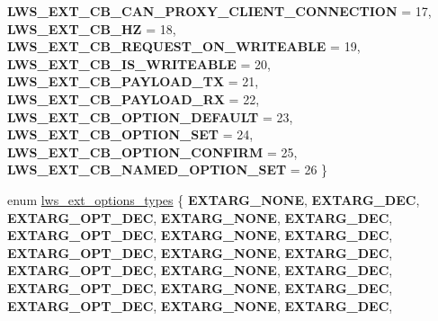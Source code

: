 \begin{DoxyCompactItemize}
\newline
{\bfseries L\+W\+S\+\_\+\+E\+X\+T\+\_\+\+C\+B\+\_\+\+C\+A\+N\+\_\+\+P\+R\+O\+X\+Y\+\_\+\+C\+L\+I\+E\+N\+T\+\_\+\+C\+O\+N\+N\+E\+C\+T\+I\+ON} = 17, 
{\bfseries L\+W\+S\+\_\+\+E\+X\+T\+\_\+\+C\+B\+\_\+HZ} = 18, 
{\bfseries L\+W\+S\+\_\+\+E\+X\+T\+\_\+\+C\+B\+\_\+\+R\+E\+Q\+U\+E\+S\+T\+\_\+\+O\+N\+\_\+\+W\+R\+I\+T\+E\+A\+B\+LE} = 19, 
{\bfseries L\+W\+S\+\_\+\+E\+X\+T\+\_\+\+C\+B\+\_\+\+I\+S\+\_\+\+W\+R\+I\+T\+E\+A\+B\+LE} = 20, 
\newline
{\bfseries L\+W\+S\+\_\+\+E\+X\+T\+\_\+\+C\+B\+\_\+\+P\+A\+Y\+L\+O\+A\+D\+\_\+\+TX} = 21, 
{\bfseries L\+W\+S\+\_\+\+E\+X\+T\+\_\+\+C\+B\+\_\+\+P\+A\+Y\+L\+O\+A\+D\+\_\+\+RX} = 22, 
{\bfseries L\+W\+S\+\_\+\+E\+X\+T\+\_\+\+C\+B\+\_\+\+O\+P\+T\+I\+O\+N\+\_\+\+D\+E\+F\+A\+U\+LT} = 23, 
{\bfseries L\+W\+S\+\_\+\+E\+X\+T\+\_\+\+C\+B\+\_\+\+O\+P\+T\+I\+O\+N\+\_\+\+S\+ET} = 24, 
\newline
{\bfseries L\+W\+S\+\_\+\+E\+X\+T\+\_\+\+C\+B\+\_\+\+O\+P\+T\+I\+O\+N\+\_\+\+C\+O\+N\+F\+I\+RM} = 25, 
{\bfseries L\+W\+S\+\_\+\+E\+X\+T\+\_\+\+C\+B\+\_\+\+N\+A\+M\+E\+D\+\_\+\+O\+P\+T\+I\+O\+N\+\_\+\+S\+ET} = 26
 \}
\item 
enum \hyperlink{group__extensions_gacc9f55936dc165257a2e1f7d47bce89e}{lws\+\_\+ext\+\_\+options\+\_\+types} \{ \newline
{\bfseries E\+X\+T\+A\+R\+G\+\_\+\+N\+O\+NE}, 
{\bfseries E\+X\+T\+A\+R\+G\+\_\+\+D\+EC}, 
{\bfseries E\+X\+T\+A\+R\+G\+\_\+\+O\+P\+T\+\_\+\+D\+EC}, 
{\bfseries E\+X\+T\+A\+R\+G\+\_\+\+N\+O\+NE}, 
\newline
{\bfseries E\+X\+T\+A\+R\+G\+\_\+\+D\+EC}, 
{\bfseries E\+X\+T\+A\+R\+G\+\_\+\+O\+P\+T\+\_\+\+D\+EC}, 
{\bfseries E\+X\+T\+A\+R\+G\+\_\+\+N\+O\+NE}, 
{\bfseries E\+X\+T\+A\+R\+G\+\_\+\+D\+EC}, 
\newline
{\bfseries E\+X\+T\+A\+R\+G\+\_\+\+O\+P\+T\+\_\+\+D\+EC}, 
{\bfseries E\+X\+T\+A\+R\+G\+\_\+\+N\+O\+NE}, 
{\bfseries E\+X\+T\+A\+R\+G\+\_\+\+D\+EC}, 
{\bfseries E\+X\+T\+A\+R\+G\+\_\+\+O\+P\+T\+\_\+\+D\+EC}, 
\newline
{\bfseries E\+X\+T\+A\+R\+G\+\_\+\+N\+O\+NE}, 
{\bfseries E\+X\+T\+A\+R\+G\+\_\+\+D\+EC}, 
{\bfseries E\+X\+T\+A\+R\+G\+\_\+\+O\+P\+T\+\_\+\+D\+EC}, 
{\bfseries E\+X\+T\+A\+R\+G\+\_\+\+N\+O\+NE}, 
\newline
{\bfseries E\+X\+T\+A\+R\+G\+\_\+\+D\+EC}, 
{\bfseries E\+X\+T\+A\+R\+G\+\_\+\+O\+P\+T\+\_\+\+D\+EC}, 
{\bfseries E\+X\+T\+A\+R\+G\+\_\+\+N\+O\+NE}, 
{\bfseries E\+X\+T\+A\+R\+G\+\_\+\+D\+EC}, 
\newline

\end{DoxyCompactItemize}
